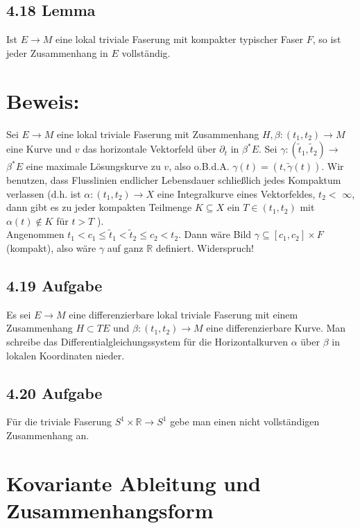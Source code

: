 \subsection*{4.18 Lemma}
Ist $E \rightarrow M$ eine lokal triviale Faserung mit kompakter typischer Faser $F$, so ist jeder Zusammenhang in $E$ vollständig.

\section*{Beweis:}
Sei $E \rightarrow M$ eine lokal triviale Faserung mit Zusammenhang $H, \beta:\left(t_{1}, t_{2}\right) \rightarrow M$ eine Kurve und $v$ das horizontale Vektorfeld über $\partial_{t}$ in $\beta^{*} E$. Sei $\gamma:\left(\tilde{t}_{1}, \tilde{t}_{2}\right) \rightarrow$ $\beta^{*} E$ eine maximale Lösungskurve zu $v$, also o.B.d.A. $\gamma(t)=(t, \tilde{\gamma}(t))$. Wir benutzen, dass Flusslinien endlicher Lebensdauer schließlich jedes Kompaktum verlassen (d.h. ist $\alpha:\left(t_{1}, t_{2}\right) \rightarrow X$ eine Integralkurve eines Vektorfeldes, $t_{2}<$ $\infty$, dann gibt es zu jeder kompakten Teilmenge $K \subseteq X$ ein $T \in\left(t_{1}, t_{2}\right)$ mit $\alpha(t) \notin K$ für $t>T$ ).\\
Angenommen $t_{1}<c_{1} \leq \tilde{t}_{1}<\tilde{t}_{2} \leq c_{2}<t_{2}$. Dann wäre Bild $\gamma \subseteq\left[c_{1}, c_{2}\right] \times F$ (kompakt), also wäre $\gamma$ auf ganz $\mathbb{R}$ definiert. Widerspruch!

\subsection*{4.19 Aufgabe}
Es sei $E \rightarrow M$ eine differenzierbare lokal triviale Faserung mit einem Zusammenhang $H \subset T E$ und $\beta:\left(t_{1}, t_{2}\right) \rightarrow M$ eine differenzierbare Kurve. Man schreibe das Differentialgleichungssystem für die Horizontalkurven $\alpha$ über $\beta$ in lokalen Koordinaten nieder.

\subsection*{4.20 Aufgabe}
Für die triviale Faserung $S^{1} \times \mathbb{R} \rightarrow S^{1}$ gebe man einen nicht vollständigen Zusammenhang an.



\pagebreak

\section{Kovariante Ableitung und Zusammenhangsform}
